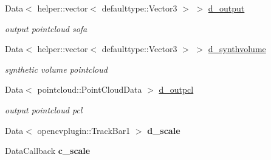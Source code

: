 \begin{DoxyCompactItemize}
Data$<$ helper\+::vector$<$ defaulttype\+::\+Vector3 $>$ $>$ \hyperlink{classsofa_1_1rgbdtracking_1_1_real_sense_abstract_deprojector_a3ef009292c2c22613c774b73b327f366}{d\+\_\+output}
\begin{DoxyCompactList}\small\item\em output pointcloud sofa \end{DoxyCompactList}\item 
\mbox{\label{classsofa_1_1rgbdtracking_1_1_real_sense_abstract_deprojector_abe1761bdd6106f7ee1b288bf3846fa71}} 
Data$<$ helper\+::vector$<$ defaulttype\+::\+Vector3 $>$ $>$ \hyperlink{classsofa_1_1rgbdtracking_1_1_real_sense_abstract_deprojector_abe1761bdd6106f7ee1b288bf3846fa71}{d\+\_\+synthvolume}
\begin{DoxyCompactList}\small\item\em synthetic volume pointcloud \end{DoxyCompactList}\item 
\mbox{\label{classsofa_1_1rgbdtracking_1_1_real_sense_abstract_deprojector_a93bfad0013b406e433cf07e342cdc4b5}} 
Data$<$ pointcloud\+::\+Point\+Cloud\+Data $>$ \hyperlink{classsofa_1_1rgbdtracking_1_1_real_sense_abstract_deprojector_a93bfad0013b406e433cf07e342cdc4b5}{d\+\_\+outpcl}
\begin{DoxyCompactList}\small\item\em output pointcloud pcl \end{DoxyCompactList}\item 
\mbox{\label{classsofa_1_1rgbdtracking_1_1_real_sense_abstract_deprojector_a01e0cd824f7c1e046f9b8a4b0fb5b8ba}} 
Data$<$ opencvplugin\+::\+Track\+Bar1 $>$ {\bfseries d\+\_\+scale}
\item 
\mbox{\label{classsofa_1_1rgbdtracking_1_1_real_sense_abstract_deprojector_ac692621d9153db98d722796883b1cb88}} 
Data\+Callback {\bfseries c\+\_\+scale}
\item 
\mbox{\label{classsofa_1_1rgbdtracking_1_1_real_sense_abstract_deprojector_a06f9d1a842d19213587304d7e1889b8d}} 

\end{DoxyCompactItemize}
